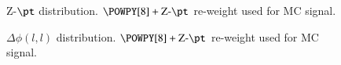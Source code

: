 \begin{figure}[h!tbp]
	\centering
	\hfill
	\caption{Z-$\pt$ distribution. $\POWPY[8]+\text{Z-}\pt$ re-weight used for MC signal.}
	\label{AFig8P}
\end{figure} 

\begin{figure}[h!tbp]
	\centering
	\hfill
	\caption{$\Delta\phi (l,l)$ distribution. $\POWPY[8]+\text{Z-}\pt$ re-weight used for MC signal.}
	\label{AFig9P}
\end{figure} 

